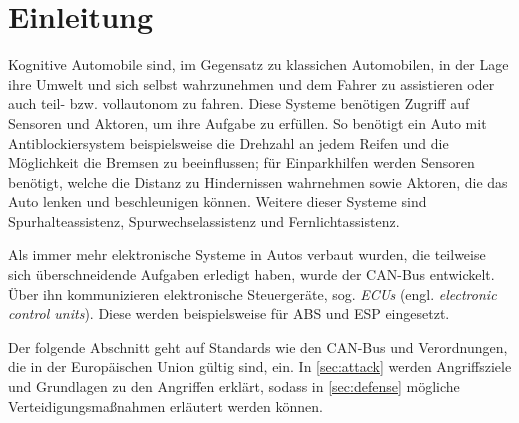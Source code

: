 
\section{Einleitung}
Kognitive Automobile sind, im Gegensatz zu klassichen Automobilen, in der Lage
ihre Umwelt und sich selbst wahrzunehmen und dem Fahrer zu assistieren oder
auch teil- bzw. vollautonom zu fahren. Diese Systeme benötigen Zugriff auf
Sensoren und Aktoren, um ihre Aufgabe zu erfüllen. So benötigt ein Auto mit
Antiblockiersystem beispielsweise die Drehzahl an jedem Reifen und die
Möglichkeit die Bremsen zu beeinflussen; für Einparkhilfen werden Sensoren
benötigt, welche die Distanz zu Hindernissen wahrnehmen sowie Aktoren, die das
Auto lenken und beschleunigen können. Weitere dieser Systeme sind
Spurhalteassistenz, Spurwechselassistenz und Fernlichtassistenz.

Als immer mehr elektronische Systeme in Autos verbaut wurden, die teilweise
sich überschneidende Aufgaben erledigt haben, wurde der CAN-Bus
entwickelt\cite{Kiencke1986}. Über ihn kommunizieren elektronische
Steuergeräte, sog. \textit{ECUs} (engl. \textit{electronic control units}).
Diese werden beispielsweise für ABS und ESP eingesetzt. %

Der folgende Abschnitt geht auf Standards wie den CAN-Bus und Verordnungen, die
in der Europäischen Union gültig sind, ein. In \cref{sec:attack} werden
Angriffsziele und Grundlagen zu den Angriffen erklärt, sodass in
\cref{sec:defense} mögliche Verteidigungsmaßnahmen erläutert werden können.